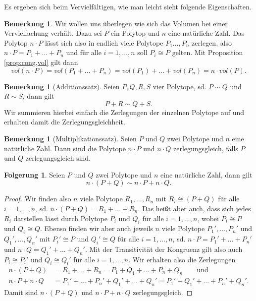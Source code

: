 \documentclass[11pt,titlepage]{article}
\theoremstyle{definition}
\newtheorem{corollary}[theorem]{Folgerung}
\newtheorem{remark}[theorem]{Bemerkung}
\theoremstyle{remark}
\begin{document}
	Es ergeben sich beim Vervielfältigen, wie man leicht sieht folgende Eigenschaften.
	
	\begin{remark}
		Wir wollen uns überlegen wie sich das Volumen bei einer Vervielfachung 
		verhält. Dazu sei $P$ ein Polytop und $n$ eine natürliche Zahl. 
		Das Polytop $n\cdot P$ lässt sich also in endlich viele Polytope 
		$P_1\ldots,P_n$ zerlegen, also $n\cdot P=P_1+\ldots+P_n$ und für alle 
		$i=1,\ldots,n$ soll $P_i\cong P$ gelten. Mit Proposition 
		\ref{prop:cong,vol} gilt dann 
		\[vol(n\cdot P)=vol(P_1+\ldots+P_n)=vol(P_1)+\ldots+vol(P_n)=n\cdot vol(P).\]
	\end{remark}
	
	\begin{remark}[Additionssatz] \label{bem:addsatz}
		Seien $P,Q,R,S$ vier Polytope, sd. $P\sim Q$ und $R\sim S$, dann gilt
		\[P+R\sim Q+S.\]
		Wir summieren hierbei einfach die Zerlegungen der einzelnen Polytope 
		auf und erhalten damit die Zerlegungsgleichheit.
	\end{remark}
	
	\begin{remark}[Multiplikationssatz] \label{bem:multsatz}
		Seien $P$ und $Q$ zwei Polytope und $n$ eine natürliche Zahl. 
		Dann sind die Polytope $n\cdot P$ und $n\cdot Q$ zerlegungsgleich, falls 
		$P$ und $Q$ zerlegungsgleich sind.
	\end{remark}
	
	\begin{corollary} \label{coroll:vervielfältigung}
		Seien $P$ und $Q$ zwei Polytope und $n$ eine natürliche Zahl, dann gilt
		\[n\cdot(P+Q)\sim n\cdot P+n\cdot Q.\]
	\end{corollary}
	
	\begin{proof}
		Wir finden also $n$ viele Polytope $R_1,\ldots,R_n$ mit 
		$R_i\cong (P+Q)$ für alle $i=1,\ldots,n$, sd. 
		$n\cdot(P+Q)=R_1+\ldots+R_n$. Das heißt aber auch, dass sich jedes 
		$R_i$ darstellen lässt durch Polytope $P_i$ und $Q_i$ für alle 
		$i=1,\ldots,n$, wobei $P_i\cong P$ und $Q_i\cong Q$. Ebenso finden wir 
		aber auch jeweils $n$ viele Polytope 
		$P_1',\ldots,P_n'$ und $Q_1',\ldots,Q_n'$ mit $P_i'\cong P$ und 
		$Q_i'\cong Q$ für alle $i=1,\ldots,n$, sd. $n\cdot P=P_1'+\ldots+P_n'$ und 
		$n\cdot Q=Q_1'+\ldots+Q_n'$. Mit der Transitivität der Kongruenz 
		gilt also auch $P_i\cong P_i'$ und $Q_i\cong Q_i'$ für alle 
		$i=1,\ldots,n$. Wir erhalten also die Zerlegungen
		\begin{align*}
		n\cdot(P+Q)&=R_1+\ldots+R_n=P_1+Q_1+\ldots+P_n+Q_n \qquad\text{und}\\
		n\cdot P+n\cdot Q&=P_1'+\ldots+P_n'+Q_1'+\ldots+Q_n'=
		P_1'+Q_1'+\ldots+P_n'+Q_n'.
		\end{align*}
		Damit sind $n\cdot (P+Q)$ und $n\cdot P+n\cdot Q$ zerlegungsgleich.
	\end{proof}
\end{document}
